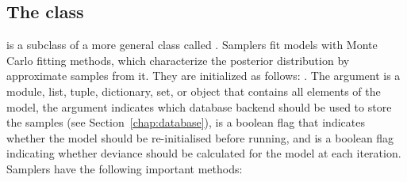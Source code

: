\documentclass[]{jss}
\begin{document}
\subsection[The Sampler class]{The  class} \label{sec:Sampler}
 is a subclass of a more general class called . Samplers fit models with Monte Carlo fitting methods, which characterize the posterior distribution by approximate samples from it. They are initialized as follows: . The  argument is a module, list, tuple, dictionary, set, or object that contains all elements of the model, the  argument indicates which database backend should be used to store the samples (see Section~\ref{chap:database}),  is a boolean flag that indicates whether the model should be re-initialised before running, and  is a boolean flag indicating whether deviance should be calculated for the model at each iteration. Samplers have the following important methods:
\end{document}
